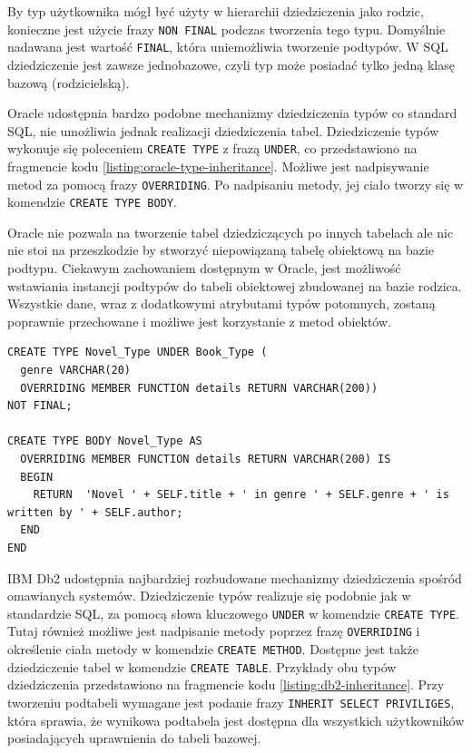 \documentclass[a4paper,twoside,12pt]{book}
\begin{document}
By typ użytkownika mógł być użyty w hierarchii dziedziczenia jako rodzic, konieczne jest użycie frazy \lstinline{NON FINAL} podczas tworzenia tego typu. Domyślnie nadawana jest wartość \lstinline{FINAL}, która uniemożliwia tworzenie podtypów. W SQL dziedziczenie jest zawsze jednobazowe, czyli typ może posiadać tylko jedną klasę bazową (rodzicielską).

Oracle udostępnia bardzo podobne mechanizmy dziedziczenia typów co standard SQL, nie umożliwia jednak realizacji dziedziczenia tabel. Dziedziczenie typów wykonuje się poleceniem \lstinline{CREATE TYPE} z frazą \lstinline{UNDER}, co przedstawiono na fragmencie kodu \ref{listing:oracle-type-inheritance}. Możliwe jest nadpisywanie metod za pomocą frazy \lstinline{OVERRIDING}. Po nadpisaniu metody, jej ciało tworzy się w komendzie \lstinline{CREATE TYPE BODY}.

Oracle nie pozwala na tworzenie tabel dziedziczących po innych tabelach ale nic nie stoi na przeszkodzie by stworzyć niepowiązaną tabelę obiektową na bazie podtypu. Ciekawym zachowaniem dostępnym w Oracle, jest możliwość wstawiania instancji podtypów do tabeli obiektowej zbudowanej na bazie rodzica. Wszystkie dane, wraz z dodatkowymi atrybutami typów potomnych, zostaną poprawnie przechowane i możliwe jest korzystanie z metod obiektów.

\begin{lstlisting}[style=SQL, caption={Dziedziczenie typu w Oracle Database.}, label={listing:oracle-type-inheritance}, captionpos=b]
CREATE TYPE Novel_Type UNDER Book_Type (
  genre VARCHAR(20) 
  OVERRIDING MEMBER FUNCTION details RETURN VARCHAR(200))
NOT FINAL;

CREATE TYPE BODY Novel_Type AS 
  OVERRIDING MEMBER FUNCTION details RETURN VARCHAR(200) IS
  BEGIN
    RETURN  'Novel ' + SELF.title + ' in genre ' + SELF.genre + ' is written by ' + SELF.author; 
  END
END
\end{lstlisting}

IBM Db2 udostępnia najbardziej rozbudowane mechanizmy dziedziczenia spośród omawianych systemów. Dziedziczenie typów realizuje się podobnie jak w standardzie SQL, za pomocą słowa kluczowego \lstinline{UNDER} w komendzie \lstinline{CREATE TYPE}. Tutaj również możliwe jest nadpisanie metody poprzez frazę \lstinline{OVERRIDING} i określenie ciała metody w komendzie \lstinline{CREATE METHOD}. Dostępne jest także dziedziczenie tabel w komendzie \lstinline{CREATE TABLE}. Przykłady obu typów dziedziczenia przedstawiono na fragmencie kodu \ref{listing:db2-inheritance}. Przy tworzeniu podtabeli wymagane jest podanie frazy \lstinline{INHERIT SELECT PRIVILIGES}, która sprawia, że wynikowa podtabela jest dostępna dla wszystkich użytkowników posiadających uprawnienia do tabeli bazowej.
\end{document}
